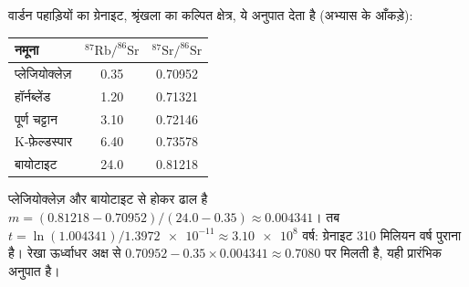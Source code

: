 \begin{example}[वार्डन ग्रेनाइट]\label{ex:g12:age-of-the-earth:varden}
वार्डन पहाड़ियों का ग्रेनाइट, श्रृंखला का कल्पित क्षेत्र, ये
अनुपात देता है (अभ्यास के आँकड़े):
\begin{center}
\small
\begin{tabular}{|l|c|c|}
\hline
नमूना & $^{87}\mathrm{Rb}/^{86}\mathrm{Sr}$ & $^{87}\mathrm{Sr}/^{86}\mathrm{Sr}$ \\
\hline
प्लेजियोक्लेज़ & 0.35 & 0.70952 \\
हॉर्नब्लेंड  & 1.20 & 0.71321 \\
पूर्ण चट्टान  & 3.10 & 0.72146 \\
K-फ़ेल्डस्पार  & 6.40 & 0.73578 \\
बायोटाइट     & 24.0 & 0.81218 \\
\hline
\end{tabular}
\end{center}
प्लेजियोक्लेज़ और बायोटाइट से होकर ढाल है
$m = (0.81218 - 0.70952)/(24.0 - 0.35) \approx 0.004341$। तब
$t = \ln(1.004341)/\num{1.3972e-11} \approx \num{3.10e8}$ वर्ष:
ग्रेनाइट 310 मिलियन वर्ष पुराना है। रेखा ऊर्ध्वाधर अक्ष से
$0.70952 - 0.35 \times 0.004341 \approx 0.7080$ पर मिलती है, यही प्रारंभिक अनुपात है।
\end{example}


